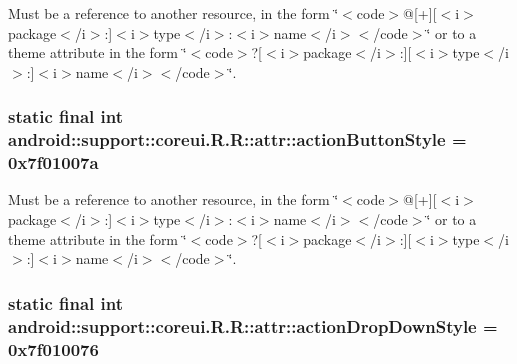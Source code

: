 Must be a reference to another resource, in the form \char`\"{}$<$code$>$@\mbox{[}+\mbox{]}\mbox{[}$<$i$>$package$<$/i$>$:\mbox{]}$<$i$>$type$<$/i$>$:$<$i$>$name$<$/i$>$$<$/code$>$\char`\"{} or to a theme attribute in the form \char`\"{}$<$code$>$?\mbox{[}$<$i$>$package$<$/i$>$:\mbox{]}\mbox{[}$<$i$>$type$<$/i$>$:\mbox{]}$<$i$>$name$<$/i$>$$<$/code$>$\char`\"{}. \hypertarget{classandroid_1_1support_1_1coreui_1_1_r_1_1attr_9f265056b33034e47bcd3249bf77d55a}{
\subsubsection[{actionButtonStyle}]{\setlength{\rightskip}{0pt plus 5cm}static final int android::support::coreui.R.R::attr::actionButtonStyle = 0x7f01007a}}
\label{classandroid_1_1support_1_1coreui_1_1_r_1_1attr_9f265056b33034e47bcd3249bf77d55a}


Must be a reference to another resource, in the form \char`\"{}$<$code$>$@\mbox{[}+\mbox{]}\mbox{[}$<$i$>$package$<$/i$>$:\mbox{]}$<$i$>$type$<$/i$>$:$<$i$>$name$<$/i$>$$<$/code$>$\char`\"{} or to a theme attribute in the form \char`\"{}$<$code$>$?\mbox{[}$<$i$>$package$<$/i$>$:\mbox{]}\mbox{[}$<$i$>$type$<$/i$>$:\mbox{]}$<$i$>$name$<$/i$>$$<$/code$>$\char`\"{}. \hypertarget{classandroid_1_1support_1_1coreui_1_1_r_1_1attr_5966770c64209a6b415d5494e4f472ea}{
\subsubsection[{actionDropDownStyle}]{\setlength{\rightskip}{0pt plus 5cm}static final int android::support::coreui.R.R::attr::actionDropDownStyle = 0x7f010076}}
\label{classandroid_1_1support_1_1coreui_1_1_r_1_1attr_5966770c64209a6b415d5494e4f472ea}


